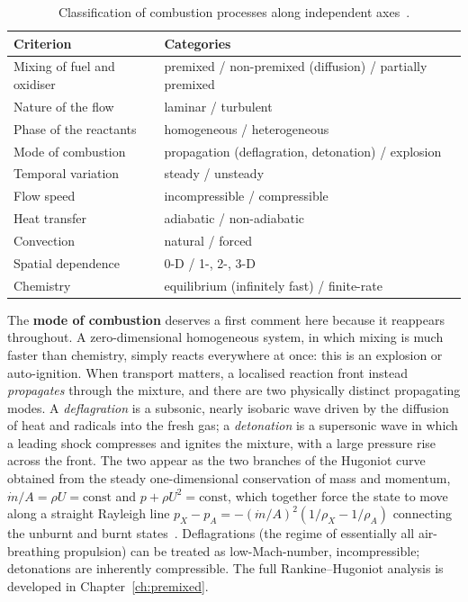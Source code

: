 \begin{table}[h]
\centering
\caption{Classification of combustion processes along independent axes~\cite{lecture4,warnatz2006combustion}.}
\label{tab:classification}
\begin{tabular}{@{}ll@{}}
\toprule
\textbf{Criterion} & \textbf{Categories} \\
\midrule
Mixing of fuel and oxidiser & premixed / non-premixed (diffusion) / partially premixed \\
Nature of the flow & laminar / turbulent \\
Phase of the reactants & homogeneous / heterogeneous \\
Mode of combustion & propagation (deflagration, detonation) / explosion \\
Temporal variation & steady / unsteady \\
Flow speed & incompressible / compressible \\
Heat transfer & adiabatic / non-adiabatic \\
Convection & natural / forced \\
Spatial dependence & 0-D / 1-, 2-, 3-D \\
Chemistry & equilibrium (infinitely fast) / finite-rate \\
\bottomrule
\end{tabular}
\end{table}

The \textbf{mode of combustion} deserves a first comment here because it reappears throughout. A zero-dimensional homogeneous system, in which mixing is much faster than chemistry, simply reacts everywhere at once: this is an explosion or auto-ignition. When transport matters, a localised reaction front instead \emph{propagates} through the mixture, and there are two physically distinct propagating modes. A \emph{deflagration} is a subsonic, nearly isobaric wave driven by the diffusion of heat and radicals into the fresh gas; a \emph{detonation} is a supersonic wave in which a leading shock compresses and ignites the mixture, with a large pressure rise across the front. The two appear as the two branches of the Hugoniot curve obtained from the steady one-dimensional conservation of mass and momentum, $\dot m/A=\rho U=\text{const}$ and $p+\rho U^2=\text{const}$, which together force the state to move along a straight Rayleigh line $p_X-p_A=-(\dot m/A)^2(1/\rho_X-1/\rho_A)$ connecting the unburnt and burnt states~\cite{lecture4,glassman2014combustion}. Deflagrations (the regime of essentially all air-breathing propulsion) can be treated as low-Mach-number, incompressible; detonations are inherently compressible. The full Rankine--Hugoniot analysis is developed in Chapter~\ref{ch:premixed}.

